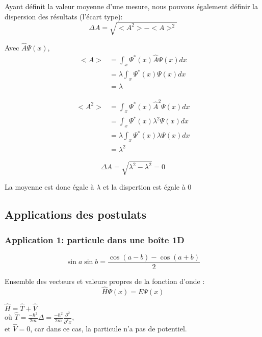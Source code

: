 \documentclass[../main.tex]{subfile}
\begin{document}
  Ayant définit la valeur moyenne d'une mesure, nous pouvons également définir la dispersion des résultats (l'écart type):
  $$\Delta A = \sqrt{<A^2> - <A>^2}$$

 \begin{ex} 
      Avec $\hat{A}\Psi(x)$, \\
      $$
    \begin{aligned}
       <A> &= \int_x \Psi^*(x) \hat{A} \Psi(x) dx\\
       &= \lambda \int_x \Psi^*(x) \Psi(x)dx\\
       &= \lambda
    \end{aligned}
      $$

      $$
     \begin{aligned} 
         <A^2> &= \int_x \Psi^*(x) \hat{A}^2 \Psi(x)dx \\
         &= \int_x \Psi^*(x) \lambda^2 \Psi(x)dx\\
         &= \lambda \int_x \Psi^*(x) \lambda \Psi(x)dx\\
         &= \lambda^2
     \end{aligned}
      $$

      $$\Delta A = \sqrt{\lambda^2 - \lambda^2} = 0$$

      La moyenne est donc égale à $\lambda$ et la dispertion est égale à $0$
 \end{ex}
 
 \subsection{Applications des postulats}
 \subsubsection{Application 1: particule dans une boîte 1D}


\begin{rap} 
      $$\sin a \sin b = \frac{\cos (a-b) - \cos (a+b)}{2}$$
\end{rap}

Ensemble des vecteurs et valeurs propres de la fonction d'onde :\\
$$\hat{H} \Psi(x) = E \Psi (x)$$

$\hat{H} = \hat{T} + \hat{V}$\\
où $\hat{T} = \frac{- \hbar^2}{2m} \Delta = \frac{-\hbar^2}{2m} \frac{\partial^2}{\partial^2 x}$,\\
et $\hat{V} = 0$, car dans ce cas, la particule n'a pas de potentiel.\\
\end{document}
